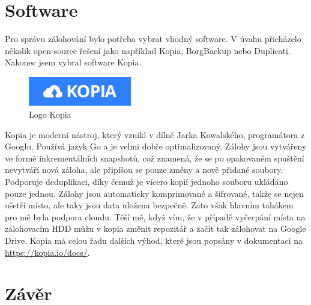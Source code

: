 \documentclass[a4paper,12pt, oneside]{book}
\begin{document}


\chapter{Software}

Pro správu zálohování bylo potřeba vybrat vhodný software. 
V úvahu přicházelo několik open-source řešení jako například 
Kopia, BorgBackup nebo Duplicati. Nakonec jsem vybral software 
Kopia. 

\begin{figure}
	\centering
	\includegraphics[width=0.4\textwidth]{img/kopia.jpg}
	\caption{Logo Kopia}
\end{figure}
Kopia je moderní nástroj, který vznikl v dílně Jarka Kowalského, 
programátora z Googlu. Používá jazyk Go a je velmi dobře optimalizovaný.
\cite{Kopia-GitHub}
Zálohy jsou vytvářeny ve formě inkrementálních snapshotů,
což znamená, že se po opakovaném spuštění nevytváří nová záloha, ale 
připíšou se pouze změny a nově přidané soubory. Podporuje deduplikaci,
díky čemuž je vícero kopií jednoho souboru ukládáno pouze jednou. 
Zálohy jsou automaticky komprimované a šifrované, takže se nejen ušetří 
místo, ale taky jsou data uložena bezpečně. \cite{Kopia-Docs} Zato však hlavním
tahákem pro mě byla podpora cloudu. Těší mě, když vím, že v případě vyčerpání
místa na 
zálohovacím HDD můžu v kopia změnit repozitář a začít tak zálohovat na 
Google Drive.
Kopia má celou řadu dalších výhod,
které jsou popsány v dokumentaci na \url{https://kopia.io/docs/}.

















\chapter{Závěr}





\nocite{*}
\printbibliography[
	heading=bibintoc,
	title={Seznam zdrojů}
]

\cleardoublepage
\listoffigures
{}
\end{document}
